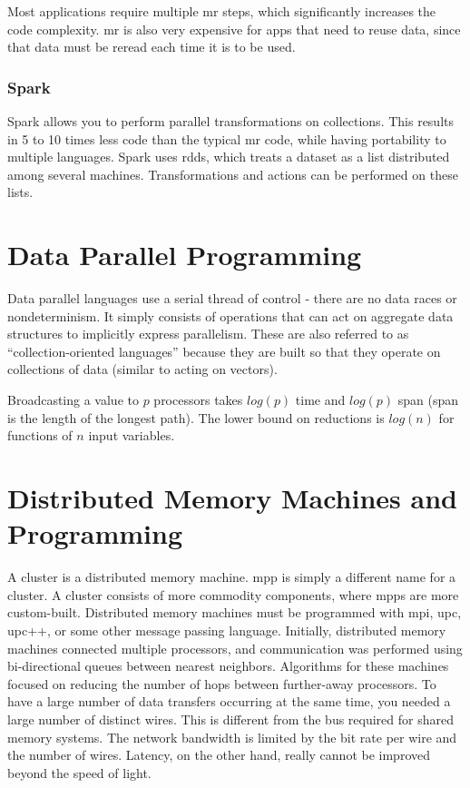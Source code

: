 \documentclass[10pt]{article}
\begin{document}
\begin{flushleft}
Most applications require multiple \gls{mr} steps, which significantly increases the code complexity. \gls{mr} is also very expensive for apps that need to reuse data, since that data must be reread each time it is to be used.

\subsubsection{Spark}

Spark allows you to perform parallel transformations on collections. This results in 5 to 10 times less code than the typical \gls{mr} code, while having portability to multiple languages. Spark uses \gls{rdd}s, which treats a dataset as a list distributed among several machines. Transformations and actions can be performed on these lists. 

\section{Data Parallel Programming}

Data parallel languages use a serial thread of control - there are no data races or nondeterminism. It simply consists of operations that can act on aggregate data structures to implicitly express parallelism. 
These are also referred to as ``collection-oriented languages'' because they are built so that they operate on collections of data (similar to acting on vectors). 

Broadcasting a value to \(p\) processors takes \(log(p)\) time and \(log(p)\) span (span is the length of the longest path). The lower bound on reductions is \(log(n)\) for functions of \(n\) input variables. 

\section{Distributed Memory Machines and Programming}

A cluster is a distributed memory machine. \gls{mpp} is simply a different name for a cluster. A cluster consists of more commodity components, where \gls{mpp}s are more custom-built. Distributed memory machines must be programmed with \gls{mpi}, \gls{upc}, \gls{upc}++, or some other message passing language. Initially, distributed memory machines connected multiple processors, and communication was performed using bi-directional queues between nearest neighbors. Algorithms for these machines focused on reducing the number of hops between further-away processors. To have a large number of data transfers occurring at the same time, you needed a large number of distinct wires. This is different from the bus required for shared memory systems. The network bandwidth is limited by the bit rate per wire and the number of wires. Latency, on the other hand, really cannot be improved beyond the speed of light.


\end{flushleft}
\end{document}
